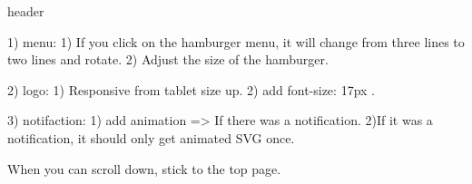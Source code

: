 header {
    1) menu: {
        1) If you click on the hamburger menu, it will change from three lines to two lines and rotate.
        2) Adjust the size of the hamburger.
    }

    2) logo: {
        1) Responsive from tablet size up.
        2) add font-size: 17px .
    }

    3) notifaction: {
        1) add animation => If there was a notification.
        2)If it was a notification, it should only get animated SVG once.
    }

    When you can scroll down, stick to the top page.
}